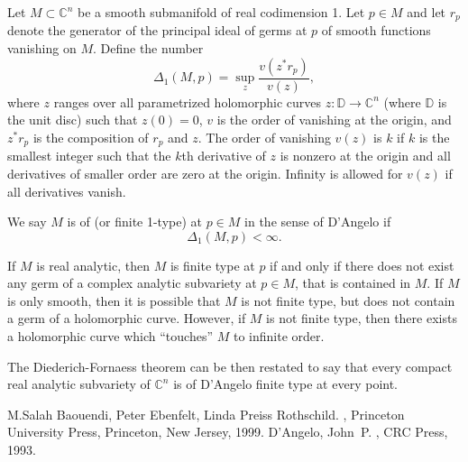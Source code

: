 \documentclass[12pt]{article}
\theoremstyle{theorem}
\theoremstyle{definition}
\theoremstyle{remark}
\begin{document}
Let $M \subset {\mathbb{C}}^n$ be a smooth submanifold of real codimension 1.  Let $p \in M$
and let $r_p$ denote the generator of the principal ideal of germs at $p$ of smooth functions vanishing on $M$.
Define the number
\begin{equation*}
\Delta_1(M,p) = \sup_{z} \frac{v(z^* r_p)}{v(z)} ,
\end{equation*}
where $z$ ranges over all parametrized holomorphic curves $z \colon {\mathbb{D}} \to {\mathbb{C}}^n$ (where
${\mathbb{D}}$ is the unit disc) such that $z(0) = 0$, $v$ is the order of vanishing at the origin, and
$z^* r_p$ is the composition of $r_p$ and $z$.
The order of vanishing $v(z)$ is $k$ if $k$ is the smallest integer such that the $k$th derivative of $z$ is nonzero at the origin and all derivatives of smaller order are zero at the origin.  Infinity is allowed for $v(z)$ if all derivatives vanish.

We
say $M$ is of \emph{} (or finite 1-type)
at $p \in M$ in the sense of D'Angelo if
\begin{equation*}
\Delta_1(M,p) < \infty .
\end{equation*}

If $M$ is real analytic, then $M$ is finite type at $p$ if and only if
there does not exist any germ of a complex analytic subvariety at $p \in M$, that is contained in $M$.
If $M$ is only smooth, then it is possible that $M$ is not finite type, but does not contain a germ of a holomorphic curve.  However, if $M$ is not finite type, then there exists a holomorphic curve which ``touches'' $M$ to infinite order.

The Diederich-Fornaess theorem can be then restated to say that every compact real analytic
subvariety of ${\mathbb{C}}^n$ is of D'Angelo finite type at every point.

\begin{thebibliography}{9}
M.\@ Salah Baouendi,
Peter Ebenfelt,
Linda Preiss Rothschild.
{\em {}},
Princeton University Press,
Princeton, New Jersey, 1999.
D'Angelo, John~P.
{\em {}},
CRC Press, 1993.
\end{thebibliography}
\end{document}
